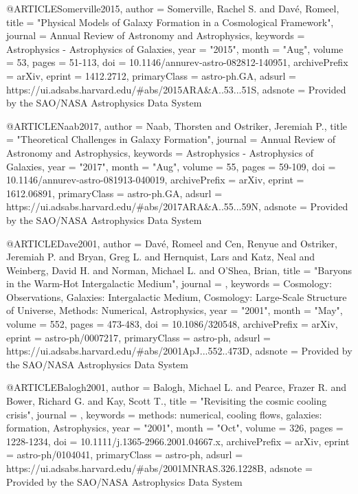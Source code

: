 {@ARTICLE{Somerville2015,
       author = {{Somerville}, Rachel S. and {Dav{\'e}}, Romeel},
        title = "{Physical Models of Galaxy Formation in a Cosmological Framework}",
      journal = {Annual Review of Astronomy and Astrophysics},
     keywords = {Astrophysics - Astrophysics of Galaxies},
         year = "2015",
        month = "Aug",
       volume = {53},
        pages = {51-113},
          doi = {10.1146/annurev-astro-082812-140951},
archivePrefix = {arXiv},
       eprint = {1412.2712},
 primaryClass = {astro-ph.GA},
       adsurl = {https://ui.adsabs.harvard.edu/\#abs/2015ARA&A..53...51S},
      adsnote = {Provided by the SAO/NASA Astrophysics Data System}
}

@ARTICLE{Naab2017,
       author = {{Naab}, Thorsten and {Ostriker}, Jeremiah P.},
        title = "{Theoretical Challenges in Galaxy Formation}",
      journal = {Annual Review of Astronomy and Astrophysics},
     keywords = {Astrophysics - Astrophysics of Galaxies},
         year = "2017",
        month = "Aug",
       volume = {55},
        pages = {59-109},
          doi = {10.1146/annurev-astro-081913-040019},
archivePrefix = {arXiv},
       eprint = {1612.06891},
 primaryClass = {astro-ph.GA},
       adsurl = {https://ui.adsabs.harvard.edu/\#abs/2017ARA&A..55...59N},
      adsnote = {Provided by the SAO/NASA Astrophysics Data System}
}

@ARTICLE{Dave2001,
       author = {{Dav{\'e}}, Romeel and {Cen}, Renyue and {Ostriker}, Jeremiah P. and
         {Bryan}, Greg L. and {Hernquist}, Lars and {Katz}, Neal and
         {Weinberg}, David H. and {Norman}, Michael L. and {O'Shea}, Brian},
        title = "{Baryons in the Warm-Hot Intergalactic Medium}",
      journal = {\apj},
     keywords = {Cosmology: Observations, Galaxies: Intergalactic Medium, Cosmology: Large-Scale Structure of Universe, Methods: Numerical, Astrophysics},
         year = "2001",
        month = "May",
       volume = {552},
        pages = {473-483},
          doi = {10.1086/320548},
archivePrefix = {arXiv},
       eprint = {astro-ph/0007217},
 primaryClass = {astro-ph},
       adsurl = {https://ui.adsabs.harvard.edu/\#abs/2001ApJ...552..473D},
      adsnote = {Provided by the SAO/NASA Astrophysics Data System}
}

@ARTICLE{Balogh2001,
       author = {{Balogh}, Michael L. and {Pearce}, Frazer R. and {Bower}, Richard G. and
         {Kay}, Scott T.},
        title = "{Revisiting the cosmic cooling crisis}",
      journal = {\mnras},
     keywords = {methods: numerical, cooling flows, galaxies: formation, Astrophysics},
         year = "2001",
        month = "Oct",
       volume = {326},
        pages = {1228-1234},
          doi = {10.1111/j.1365-2966.2001.04667.x},
archivePrefix = {arXiv},
       eprint = {astro-ph/0104041},
 primaryClass = {astro-ph},
       adsurl = {https://ui.adsabs.harvard.edu/\#abs/2001MNRAS.326.1228B},
      adsnote = {Provided by the SAO/NASA Astrophysics Data System}
}

}
